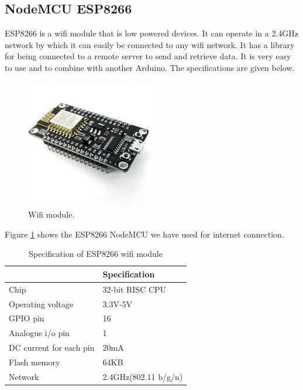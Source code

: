 \subsection{NodeMCU  ESP8266}
ESP8266 is a wifi module that is low powered devices. It can operate in a 2.4GHz network by which it can easily be connected to any wifi network. It has a library for being connected to a remote server to send and retrieve data. It is very easy to use and to combine with another Arduino. The specifications are given below. 
\begin{figure}[h]
\centering
\includegraphics[width=0.5\textwidth]{figures/wifi_module.jpg}
\caption{Wifi module.}
\label{NodeMCU1}
\end{figure}
Figure \ref{NodeMCU1} shows the ESP8266 NodeMCU we have used for internet connection.

\begin{table}[H]
\centering
\caption{Specification of ESP8266 wifi module}
\begin{tabular}{|l|l|}
\hline
\multicolumn{1}{|c|}{\cellcolor[HTML]{FFFFFF}{\color[HTML]{333333} \textbf{Characteristics}}} & \textbf{Specification} \\ \hline
Chip                                                                                    & 32-bit RISC CPU        \\ \hline
Operating voltage                                                                       & 3.3V-5V                \\ \hline
GPIO pin                                                                                & 16                     \\ \hline
Analogue i/o pin                                                                        & 1                      \\ \hline
DC current for each pin                                                                 & 20mA                   \\ \hline
Flash memory                                                                            & 64KB                   \\ \hline
Network                                                                                 & 2.4GHz(802.11 b/g/n)   \\ \hline
\end{tabular}
\end{table}

